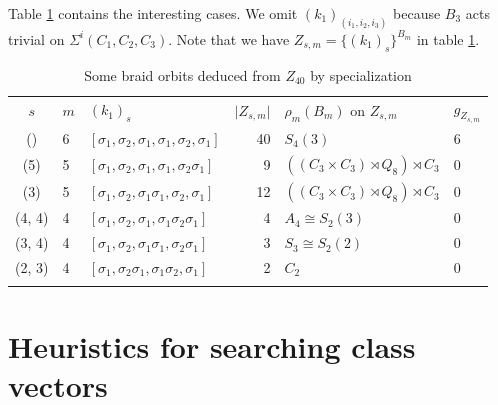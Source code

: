 \documentclass[12pt,a4paper]{article}
\numberwithin{equation}{section}
\numberwithin{table}{section}
\begin{document}
Table \ref{tab:SomeBraidOrbitsDerivedFromZ40} contains the interesting cases. 
We omit $(k_1)_{(i_1,i_2,i_3)}$ because $B_3$ acts trivial on $\Sigma^i(C_1,C_2,C_3)$.
Note that we have $Z_{s,m} = \{(k_1)_s\}^{B_m} $ in table \ref{tab:SomeBraidOrbitsDerivedFromZ40}.
%
\begin{table}[!htbp]
\centering
\footnotesize
\captionsetup{font=footnotesize}
\caption{Some braid orbits deduced from $Z_{40}$ by specialization}
\label{tab:SomeBraidOrbitsDerivedFromZ40}
\begin{tabular}{cllrll}
\hline\noalign{\smallskip}
$s$ & $m$ & $(k_1)_s$ & $\vert Z_{s,m} \vert$ & $\rho_m(B_m)$ on $Z_{s,m}$ & $g_{Z_{s,m}}$ \\
\noalign{\smallskip}\hline\noalign{\smallskip}
()     & 6 & $[\sigma_1,\sigma_2,\sigma_1,\sigma_1,\sigma_2,\sigma_1]$ & 40 & $S_4(3)$ & 6 \\
(5)    & 5 & $[\sigma_1,\sigma_2,\sigma_1,\sigma_1,\sigma_2\sigma_1]$ &  9 & $((C_3 \times C_3) \rtimes Q_8) \rtimes C_3$ & 0 \\
(3)    & 5 & $[\sigma_1,\sigma_2,\sigma_1\sigma_1,\sigma_2,\sigma_1]$ & 12 & $((C_3 \times C_3) \rtimes Q_8) \rtimes C_3$ & 0 \\
(4, 4) & 4 & $[\sigma_1,\sigma_2,\sigma_1,\sigma_1\sigma_2\sigma_1]$ &  4 & $A_4 \cong S_2(3)$ & 0 \\
(3, 4) & 4 & $[\sigma_1,\sigma_2,\sigma_1\sigma_1,\sigma_2\sigma_1]$ &  3 & $S_3 \cong S_2(2)$ & 0 \\
(2, 3) & 4 & $[\sigma_1,\sigma_2\sigma_1,\sigma_1\sigma_2,\sigma_1]$ &  2 & $C_2$ & 0 \\
\noalign{\smallskip}\hline
\end{tabular}
\end{table}

\section{Heuristics for searching class vectors}\label{SectionHeuristicsForSearching}
\end{document}
